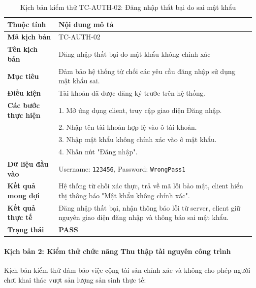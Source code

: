 \documentclass[../Project.tex]{subfiles}
\begin{document}
\begin{table}[H]
\centering
\begin{tabular}{|l|p{10.5cm}|}
\hline
\textbf{Thuộc tính} & \textbf{Nội dung mô tả} \\ \hline
\textbf{Mã kịch bản} & TC-AUTH-02 \\ \hline
\textbf{Tên kịch bản} & Đăng nhập thất bại do mật khẩu không chính xác \\ \hline
\textbf{Mục tiêu} & Đảm bảo hệ thống từ chối các yêu cầu đăng nhập sử dụng mật khẩu sai. \\ \hline
\textbf{Điều kiện} & Tài khoản đã được đăng ký trước trên hệ thống. \\ \hline
\textbf{Các bước thực hiện} & 
1. Mở ứng dụng client, truy cập giao diện Đăng nhập. \\
& 2. Nhập tên tài khoản hợp lệ vào ô tài khoản. \\
& 3. Nhập mật khẩu không chính xác vào ô mật khẩu. \\
& 4. Nhấn nút "Đăng nhập". \\ \hline
\textbf{Dữ liệu đầu vào} & Username: \texttt{123456}, Password: \texttt{WrongPass1} \\ \hline
\textbf{Kết quả mong đợi} & Hệ thống từ chối xác thực, trả về mã lỗi bảo mật, client hiển thị thông báo "Mật khẩu không chính xác". \\ \hline
\textbf{Kết quả thực tế} & Đăng nhập thất bại, nhận thông báo lỗi từ server, client giữ nguyên giao diện đăng nhập và thông báo sai mật khẩu. \\ \hline
\textbf{Trạng thái} & \textbf{PASS} \\ \hline
\end{tabular}
\caption{Kịch bản kiểm thử TC-AUTH-02: Đăng nhập thất bại do sai mật khẩu}
\label{tab:tc_auth_02}
\end{table}

\paragraph{Kịch bản 2: Kiểm thử chức năng Thu thập tài nguyên công trình}
Kịch bản kiểm thử đảm bảo việc cộng tài sản chính xác và không cho phép người chơi khai thác vượt sản lượng sản sinh thực tế:
\end{document}
